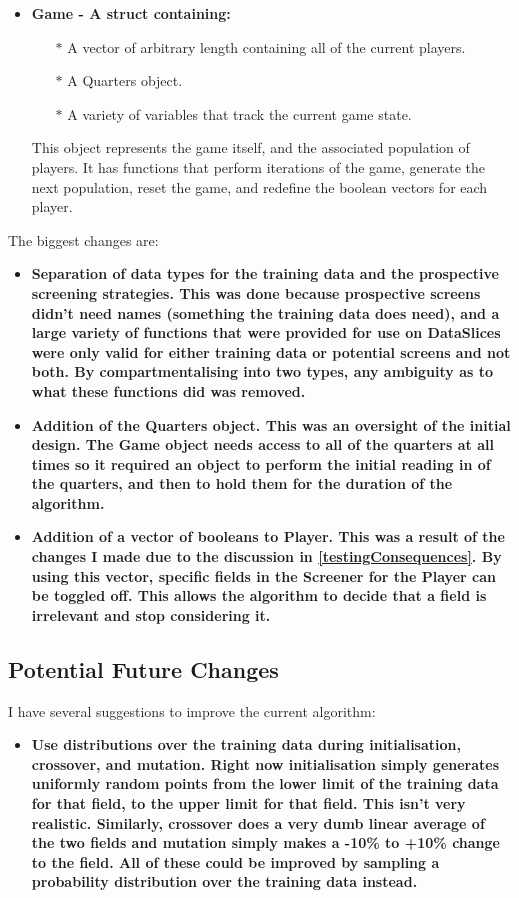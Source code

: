\begin{itemize}
    \item \bf Game \rm - A struct containing:
    \begin{itemize}
        \item[$\ast$] A vector of arbitrary length containing all of the current players.
        \item[$\ast$] A Quarters object.
        \item[$\ast$] A variety of variables that track the current game state.
    \end{itemize}
        This object represents the game itself, and the associated population of players. It has functions that perform iterations of the game, generate the next population, reset the game, and redefine the boolean vectors for each player.
\end{itemize}

The biggest changes are:
\begin{itemize}
    \item \bf Separation of data types for the training data and the prospective screening strategies. \rm This was done because prospective screens didn't need names (something the training data does need), and a large variety of functions that were provided for use on DataSlices were only valid for either training data or potential screens and not both. By compartmentalising into two types, any ambiguity as to what these functions did was removed.
    \item \bf Addition of the Quarters object. \rm This was an oversight of the initial design. The Game object needs access to all of the quarters at all times so it required an object to perform the initial reading in of the quarters, and then to hold them for the duration of the algorithm.
    \item \bf Addition of a vector of booleans to Player. \rm This was a result of the changes I made due to the discussion in \ref{testingConsequences}. By using this vector, specific fields in the Screener for the Player can be toggled off. This allows the algorithm to decide that a field is irrelevant and stop considering it.
\end{itemize}

\subsection{Potential Future Changes}
I have several suggestions to improve the current algorithm:

\begin{itemize}
    \item \bf Use distributions over the training data during initialisation, crossover, and mutation. \rm Right now initialisation simply generates uniformly random points from the lower limit of the training data for that field, to the upper limit for that field. This isn't very realistic. Similarly, crossover does a very dumb linear average of the two fields and mutation simply makes a -10\% to +10\% change to the field. All of these could be improved by sampling a probability distribution over the training data instead.
\end{itemize}
